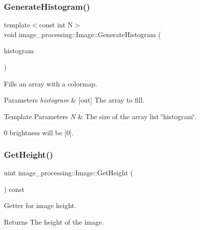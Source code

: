 \subsubsection{\texorpdfstring{Generate\+Histogram()}{GenerateHistogram()}}
{\footnotesize\ttfamily template$<$const int N$>$ \\
void image\+\_\+processing\+::\+Image\+::\+Generate\+Histogram (\begin{DoxyParamCaption}\item[{\hyperlink{classutil_1_1ArrayList}{Array\+List}$<$ uint, N $>$ $\ast$}]{histogram }\end{DoxyParamCaption})\hspace{0.3cm}{\ttfamily [inline]}}



Fills an array with a colormap. 


\begin{DoxyParams}{Parameters}
{\em histogram} & \mbox{[}out\mbox{]} The array to fill. \\
\hline
\end{DoxyParams}

\begin{DoxyTemplParams}{Template Parameters}
{\em N} & The size of the array list \char`\"{}histogram\char`\"{}.\\
\hline
\end{DoxyTemplParams}
0 brightness will be \mbox{[}0\mbox{]}. \mbox{\label{classimage__processing_1_1Image_a13ef94cffdbbf778228062afec20795c}} 
\subsubsection{\texorpdfstring{Get\+Height()}{GetHeight()}}
{\footnotesize\ttfamily uint image\+\_\+processing\+::\+Image\+::\+Get\+Height (\begin{DoxyParamCaption}{ }\end{DoxyParamCaption}) const}



Getter for image height. 

\begin{DoxyReturn}{Returns}
The height of the image. 
\end{DoxyReturn}
\mbox{\label{classimage__processing_1_1Image_a13ca8eb1de2d50b853df8fcb40526eeb}} 
